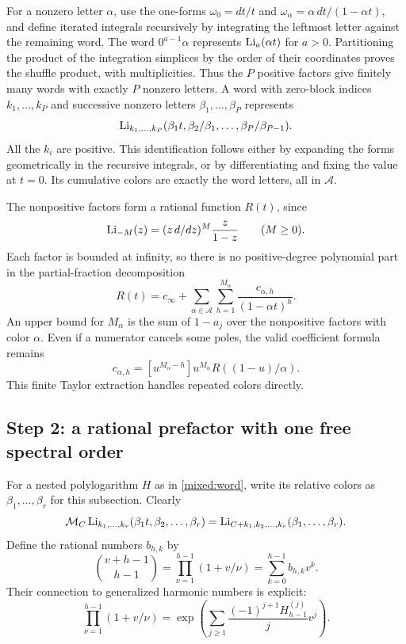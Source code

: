 For a nonzero letter $\alpha$, use the one-forms
$\omega_0=dt/t$ and $\omega_\alpha=\alpha\,dt/(1-\alpha t)$,
and define iterated integrals recursively by integrating the leftmost
letter against the remaining word. The word
$0^{a-1}\alpha$ represents $\operatorname{Li}_a(\alpha t)$ for $a>0$.
Partitioning the product of the integration simplices by the order
of their coordinates proves the shuffle product, with multiplicities.
Thus the $P$ positive factors give finitely many words with exactly
$P$ nonzero letters. A word with zero-block indices $k_1,\ldots,k_P$
and successive nonzero letters $\beta_1,\ldots,\beta_P$ represents
\begin{equation}\label{mixed:word}
 \operatorname{Li}_{k_1,\ldots,k_P}
       (\beta_1t,\beta_2/\beta_1,\ldots,\beta_P/\beta_{P-1}).
\end{equation}
All the $k_i$ are positive. This identification follows either by
expanding the forms geometrically in the recursive integrals, or by
differentiating and fixing the value at $t=0$. Its cumulative colors
are exactly the word letters, all in $\mathcal A$.

The nonpositive factors form a rational function $R(t)$, since
\[
 \operatorname{Li}_{-M}(z)=(z\,d/dz)^M\frac{z}{1-z}\qquad(M\ge0).
\]
Each factor is bounded at infinity, so there is no positive-degree
polynomial part in the partial-fraction decomposition
\begin{equation}\label{mixed:R}
 R(t)=c_\infty+\sum_{\alpha\in\mathcal A}\sum_{h=1}^{M_\alpha}
                         \frac{c_{\alpha,h}}{(1-\alpha t)^h}.
\end{equation}
An upper bound for $M_\alpha$ is the sum of $1-a_j$ over the
nonpositive factors with color $\alpha$. Even if a numerator cancels
some poles, the valid coefficient formula remains
\begin{equation}\label{mixed:partialcoeff}
 c_{\alpha,h}=[u^{M_\alpha-h}]
                 u^{M_\alpha}R((1-u)/\alpha).
\end{equation}
This finite Taylor extraction handles repeated colors directly.

\subsection{Step 2: a rational prefactor with one free spectral order}

For a nested polylogarithm $H$ as in \eqref{mixed:word}, write its
relative colors as $\beta_1,\ldots,\beta_r$ for this subsection.
Clearly
\[
 \mathcal M_C\operatorname{Li}_{k_1,\ldots,k_r}(\beta_1t,\beta_2,\ldots,\beta_r)
   =\operatorname{Li}_{C+k_1,k_2,\ldots,k_r}(\beta_1,\ldots,\beta_r).
\]
Define the rational numbers $b_{h,k}$ by
\begin{equation}\label{mixed:b}
 \binom{v+h-1}{h-1}=
       \prod_{\nu=1}^{h-1}(1+v/\nu)
       =\sum_{k=0}^{h-1}b_{h,k}v^k.
\end{equation}
Their connection to generalized harmonic numbers is explicit:
\[
 \prod_{\nu=1}^{h-1}(1+v/\nu)
   =\exp\left(\sum_{j\ge1}
          \frac{(-1)^{j+1}H_{h-1}^{(j)}}{j}v^j\right).
\]

